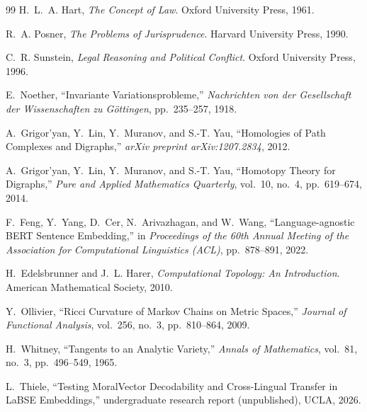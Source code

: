 \documentclass[12pt]{article}
\theoremstyle{definition}
\theoremstyle{remark}
\begin{document}
\begin{thebibliography}{99}
H.~L.~A. Hart, \emph{The Concept of Law}. Oxford University Press, 1961.

R.~A. Posner, \emph{The Problems of Jurisprudence}. Harvard University Press, 1990.

C.~R. Sunstein, \emph{Legal Reasoning and Political Conflict}. Oxford University Press, 1996.

E.~Noether, ``Invariante Variationsprobleme,'' \emph{Nachrichten von der Gesellschaft der Wissenschaften zu G\"{o}ttingen}, pp.~235--257, 1918.

A.~Grigor'yan, Y.~Lin, Y.~Muranov, and S.-T. Yau, ``Homologies of Path Complexes and Digraphs,'' \emph{arXiv preprint arXiv:1207.2834}, 2012.

A.~Grigor'yan, Y.~Lin, Y.~Muranov, and S.-T. Yau, ``Homotopy Theory for Digraphs,'' \emph{Pure and Applied Mathematics Quarterly}, vol.~10, no.~4, pp.~619--674, 2014.

F.~Feng, Y.~Yang, D.~Cer, N.~Arivazhagan, and W.~Wang, ``Language-agnostic BERT Sentence Embedding,'' in \emph{Proceedings of the 60th Annual Meeting of the Association for Computational Linguistics (ACL)}, pp.~878--891, 2022.

H.~Edelsbrunner and J.~L. Harer, \emph{Computational Topology: An Introduction}. American Mathematical Society, 2010.

Y.~Ollivier, ``Ricci Curvature of Markov Chains on Metric Spaces,'' \emph{Journal of Functional Analysis}, vol.~256, no.~3, pp.~810--864, 2009.

H.~Whitney, ``Tangents to an Analytic Variety,'' \emph{Annals of Mathematics}, vol.~81, no.~3, pp.~496--549, 1965.

L.~Thiele, ``Testing MoralVector Decodability and Cross-Lingual Transfer in LaBSE Embeddings,'' undergraduate research report (unpublished), UCLA, 2026.

\end{thebibliography}
\end{document}
